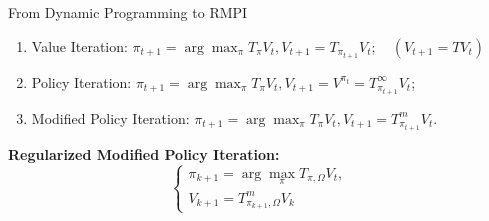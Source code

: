 \documentclass{beamer}
\begin{document}
\begin{frame}[t]{From Dynamic Programming to RMPI}
    \begin{enumerate}
        \item Value Iteration: $ \pi_{t+1} = \arg\max_{\pi} T_{\pi} V_{t}, V_{t+1} = T_{\pi_{t+1}} V_t; \quad (V_{t+1} = T V_t) $
        \item Policy Iteration: $  \pi_{t+1} = \arg\max_{\pi} T_{\pi} V_{t}, V_{t+1} = V^{\pi_{t}} = T^{\infty}_{\pi_{t+1}} V_{t}$;
        \item Modified Policy Iteration: $ \pi_{t+1} = \arg\max_{\pi} T_{\pi} V_t, V_{t+1} = T^{m}_{\pi_{t+1}} V_t $.
    \end{enumerate}
    \textbf{Regularized Modified Policy Iteration:}
    \[
        \begin{cases}
            \pi_{k+1} = \arg\max_{\pi} T_{\pi, \Omega} V_t,\\
            V_{k+1} = T^{m}_{\pi_{k+1}, \Omega} V_k
        \end{cases}
    \]
    
\end{frame}
\end{document}

